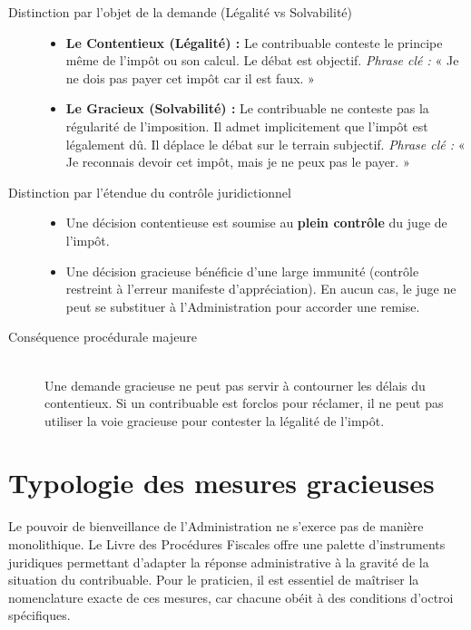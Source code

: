 \documentclass[Cours_contentieuxTF2026.tex]{subfiles}
\begin{document}
	\begin{description}
		\item[Distinction par l'objet de la demande (Légalité vs Solvabilité)] \hfill
		\begin{itemize}
			\item \textbf{Le Contentieux (Légalité) :} Le contribuable conteste le principe même de l'impôt ou son calcul. Le débat est objectif.
			\textit{Phrase clé :} « Je ne dois pas payer cet impôt car il est faux. »
			\item \textbf{Le Gracieux (Solvabilité) :} Le contribuable ne conteste pas la régularité de l'imposition. Il admet implicitement que l'impôt est légalement dû. Il déplace le débat sur le terrain subjectif.
			\textit{Phrase clé :} « Je reconnais devoir cet impôt, mais je ne peux pas le payer. »
		\end{itemize}
		
		\item[Distinction par l'étendue du contrôle juridictionnel] \hfill
		\begin{itemize}
			\item Une décision contentieuse est soumise au \textbf{plein contrôle} du juge de l'impôt.
			\item Une décision gracieuse bénéficie d'une large immunité (contrôle restreint à l'erreur manifeste d'appréciation). En aucun cas, le juge ne peut se substituer à l'Administration pour accorder une remise.
		\end{itemize}
		
		\item[Conséquence procédurale majeure] \hfill \\
		Une demande gracieuse ne peut pas servir à contourner les délais du contentieux. Si un contribuable est forclos pour réclamer, il ne peut pas utiliser la voie gracieuse pour contester la légalité de l'impôt.
	\end{description}
	
	
\section{Typologie des mesures gracieuses}

Le pouvoir de bienveillance de l'Administration ne s'exerce pas de manière monolithique. Le Livre des Procédures Fiscales offre une palette d'instruments juridiques permettant d'adapter la réponse administrative à la gravité de la situation du contribuable. Pour le praticien, il est essentiel de maîtriser la nomenclature exacte de ces mesures, car chacune obéit à des conditions d'octroi spécifiques.
\end{document}
